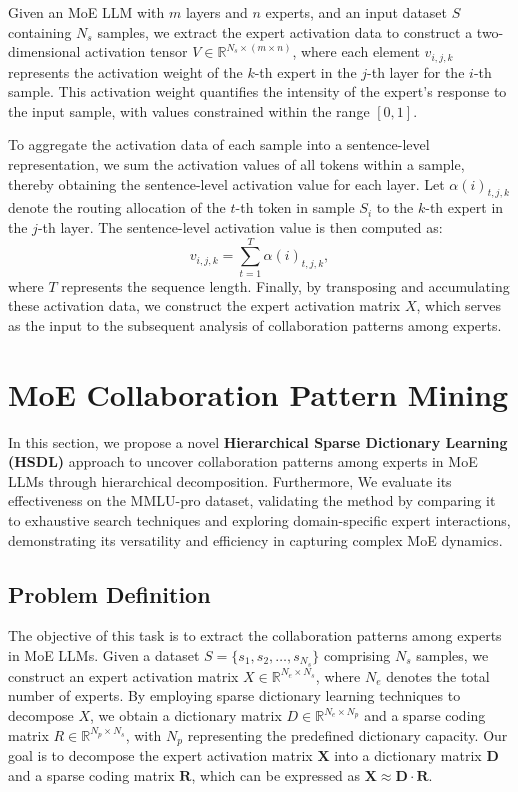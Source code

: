 \documentclass[11pt]{article}
\begin{document}
Given an MoE LLM with \( m \) layers and \( n \) experts, and an input dataset \( S \) containing \( N_s \) samples, we extract the expert activation data to construct a two-dimensional activation tensor \( V \in \mathbb{R}^{N_s \times (m \times n)} \), where each element \( v_{i,j,k} \) represents the activation weight of the \( k \)-th expert in the \( j \)-th layer for the \( i \)-th sample. This activation weight quantifies the intensity of the expert's response to the input sample, with values constrained within the range \([0, 1]\).

To aggregate the activation data of each sample into a sentence-level representation, we sum the activation values of all tokens within a sample, thereby obtaining the sentence-level activation value for each layer. Let \( \alpha(i)_{t,j,k} \) denote the routing allocation of the \( t \)-th token in sample \( S_i \) to the \( k \)-th expert in the \( j \)-th layer. The sentence-level activation value is then computed as:
\begin{equation}
v_{i,j,k} = \sum_{t=1}^{T} \alpha(i)_{t,j,k},
\end{equation}
where \( T \) represents the sequence length. Finally, by transposing and accumulating these activation data, we construct the expert activation matrix \( X \), which serves as the input to the subsequent analysis of collaboration patterns among experts.


\section{MoE Collaboration Pattern Mining}

In this section, we propose a novel \textbf{Hierarchical Sparse Dictionary Learning (HSDL)} approach to uncover collaboration patterns among experts in MoE LLMs through hierarchical decomposition. Furthermore, We evaluate its effectiveness on the MMLU-pro dataset, validating the method by comparing it to exhaustive search techniques and exploring domain-specific expert interactions, demonstrating its versatility and efficiency in capturing complex MoE dynamics.


\subsection{Problem Definition}

The objective of this task is to extract the collaboration patterns among experts in MoE LLMs. Given a dataset $S = \{s_1, s_2, \dots, s_{N_s}\}$ comprising $N_s$ samples, we construct an expert activation matrix $X \in \mathbb{R}^{N_e \times N_s}$, where $N_e$ denotes the total number of experts. By employing sparse dictionary learning techniques to decompose $X$, we obtain a dictionary matrix $D \in \mathbb{R}^{N_e \times N_p}$ and a sparse coding matrix $R \in \mathbb{R}^{N_p \times N_s}$, with $N_p$ representing the predefined dictionary capacity. Our goal is to decompose the expert activation matrix \( \mathbf{X} \) into a dictionary matrix \( \mathbf{D} \) and a sparse coding matrix \( \mathbf{R} \), which can be expressed as $\mathbf{X} \approx \mathbf{D} \cdot \mathbf{R}$.
\end{document}
